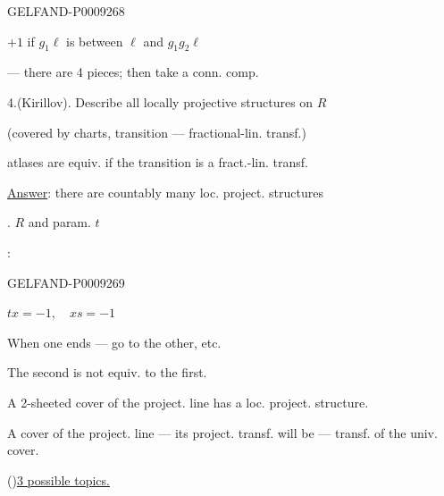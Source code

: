 \begin{GelfandAdjacentEvidence}{GELFAND-P000926}{8}


$+1$ if $g_1\ell$ is between $\ell$ and $g_1g_2\ell$

 --- there are 4 pieces; then take a conn. comp.

4.\enspace (Kirillov). Describe all locally projective structures on $R$

(covered by charts, transition --- fractional-lin. transf.)

atlases are equiv. if the transition is a fract.-lin. transf.

\underline{Answer}: there are countably many loc. project. structures

. $R$ and param. $t$

:
\end{GelfandAdjacentEvidence}
\begin{GelfandAdjacentEvidence}{GELFAND-P000926}{9}


 $tx=-1,\quad xs=-1$

When one ends --- go to the other, etc.

The second is not equiv. to the first.

A 2-sheeted cover of the project. line has a loc. project. structure.

A cover of the project. line --- its project. transf. will be --- transf. of the univ. cover.

 ()\qquad\underline{3 possible topics.}
\end{GelfandAdjacentEvidence}
